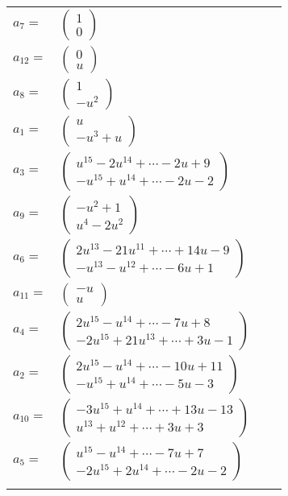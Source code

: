 \documentclass[1p]{elsarticle_modified}
\theoremstyle{definition}
\begin{document}
\begin{tabular}{m{7pt} m{180pt} m{7pt} m{180pt} }
\flushright $a_{7}=$&$\begin{pmatrix}1\\0\end{pmatrix}$ \\
\flushright $a_{12}=$&$\begin{pmatrix}0\\u\end{pmatrix}$ \\
\flushright $a_{8}=$&$\begin{pmatrix}1\\- u^2\end{pmatrix}$ \\
\flushright $a_{1}=$&$\begin{pmatrix}u\\- u^3+u\end{pmatrix}$ \\
\flushright $a_{3}=$&$\begin{pmatrix}u^{15}-2 u^{14}+\cdots-2 u+9\\- u^{15}+u^{14}+\cdots-2 u-2\end{pmatrix}$ \\
\flushright $a_{9}=$&$\begin{pmatrix}- u^2+1\\u^4-2 u^2\end{pmatrix}$ \\
\flushright $a_{6}=$&$\begin{pmatrix}2 u^{13}-21 u^{11}+\cdots+14 u-9\\- u^{13}- u^{12}+\cdots-6 u+1\end{pmatrix}$ \\
\flushright $a_{11}=$&$\begin{pmatrix}- u\\u\end{pmatrix}$ \\
\flushright $a_{4}=$&$\begin{pmatrix}2 u^{15}- u^{14}+\cdots-7 u+8\\-2 u^{15}+21 u^{13}+\cdots+3 u-1\end{pmatrix}$ \\
\flushright $a_{2}=$&$\begin{pmatrix}2 u^{15}- u^{14}+\cdots-10 u+11\\- u^{15}+u^{14}+\cdots-5 u-3\end{pmatrix}$ \\
\flushright $a_{10}=$&$\begin{pmatrix}-3 u^{15}+u^{14}+\cdots+13 u-13\\u^{13}+u^{12}+\cdots+3 u+3\end{pmatrix}$ \\
\flushright $a_{5}=$&$\begin{pmatrix}u^{15}- u^{14}+\cdots-7 u+7\\-2 u^{15}+2 u^{14}+\cdots-2 u-2\end{pmatrix}$\\&\end{tabular}
\end{document}
